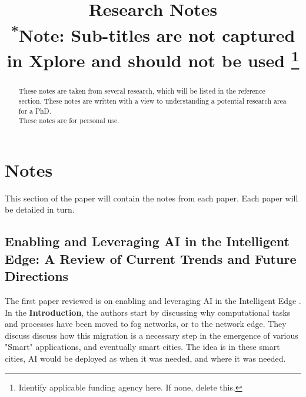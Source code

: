 \documentclass[conference]{IEEEtran}
\begin{document}
\title{Research Notes\\
{\footnotesize \textsuperscript{*}Note: Sub-titles are not captured in Xplore and
should not be used}
\thanks{Identify applicable funding agency here. If none, delete this.}
}


\author{
}

\maketitle

\begin{abstract}
These notes are taken from several research, which will be listed in the reference section. These notes are written with a view to understanding a potential research area for a PhD. \\
\noindent These notes are for personal use.
\end{abstract}

\begin{IEEEkeywords}

\end{IEEEkeywords}

\section{Notes}
This section of the paper will contain the notes from each paper. Each paper will be detailed in turn.

\subsection{Enabling and Leveraging AI in the Intelligent Edge:
A Review of Current Trends and Future Directions}

The first paper reviewed is on enabling and leveraging AI in the Intelligent Edge \cite{b1}. In the \textbf{Introduction}, the authors start by discussing why computational tasks and processes have been moved to fog networks, or to the network edge. They discuss discuss how this migration is a necessary step in the emergence of various "Smart" applications, and eventually smart cities. The idea is in these smart cities, AI would be deployed as when it was needed, and where it was needed. 
\end{document}
